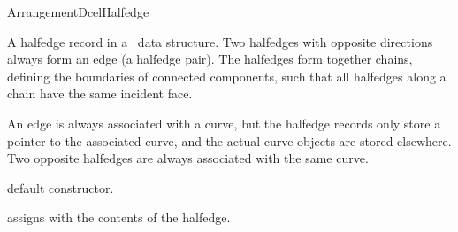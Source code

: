 
\ccRefPageBegin

\begin{ccRefConcept}{ArrangementDcelHalfedge}

\ccDefinition

A halfedge record in a \dcel\ data structure. Two halfedges with opposite
directions always form an edge (a halfedge pair). The halfedges form together
chains, defining the boundaries of connected components, such that all
halfedges along a chain have the same incident face.

An edge is always associated with a curve, but the halfedge records only
store a pointer to the associated curve, and the actual curve objects
are stored elsewhere. Two opposite halfedges are always associated with
the same curve.


\ccTypes

\ccGlue
{}


\ccCreation

   {default constructor.}

   {assigns \ccVar{} with the contents of the  halfedge.}

\end{ccRefConcept}
